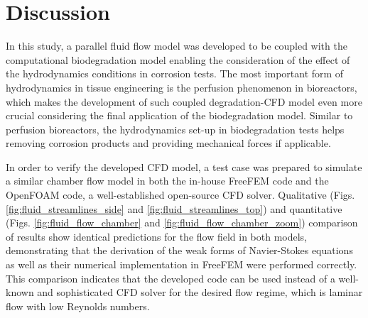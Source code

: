 \section{Discussion}


In this study, a parallel fluid flow model was developed to be coupled with the computational biodegradation model enabling the consideration of the effect of the hydrodynamics conditions in corrosion tests. The most important form of hydrodynamics in tissue engineering is the perfusion phenomenon in bioreactors, which makes the development of such coupled degradation-\gls{CFD} model even more crucial considering the final application of the biodegradation model. Similar to perfusion bioreactors, the hydrodynamics set-up in biodegradation tests helps removing corrosion products and providing mechanical forces if applicable.


In order to verify the developed \gls{CFD} model, a test case was prepared to simulate a similar chamber flow model in both the in-house FreeFEM code and the OpenFOAM code, a well-established open-source \gls{CFD} solver. Qualitative (Figs. \ref{fig:fluid_streamlines_side} and \ref{fig:fluid_streamlines_top}) and quantitative (Figs. \ref{fig:fluid_flow_chamber} and \ref{fig:fluid_flow_chamber_zoom}) comparison of results show identical predictions for the flow field in both models, demonstrating that the derivation of the weak forms of Navier-Stokes equations as well as their numerical implementation in FreeFEM were performed correctly. This comparison indicates that the developed code can be used instead of a well-known and sophisticated \gls{CFD} solver for the desired flow regime, which is laminar flow with low Reynolds numbers.


